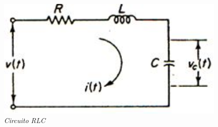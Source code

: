 \documentclass[12pt,a4paper]{report}
\begin{document}
  \vspace{-1cm}
  \noindent
  \begin{figure}[h]
    \centering
    \begin{minipage}[h]{0.5\textwidth}
      \centering
      \includegraphics[width=1\textwidth]{./images/ej4.5.jpg}
      \textit{Circuito RLC}
    \end{minipage}
  \end{figure}
\end{document}
